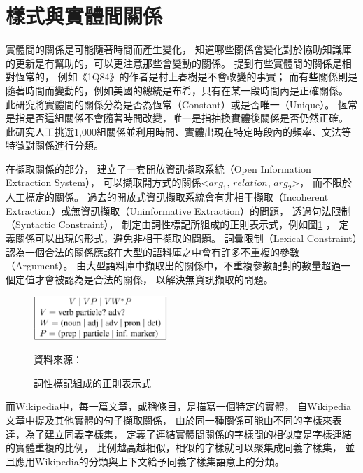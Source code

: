 
%
%
\section{樣式與實體間關係}

實體間的關係是可能隨著時間而產生變化，
知道哪些關係會變化對於協助知識庫的更新是有幫助的，可以更注意那些會變動的關係。
\cite{relationsByTime} 提到有些實體間的關係是相對恆常的，
例如《1Q84》的作者是村上春樹是不會改變的事實；
而有些關係則是隨著時間而變動的，例如美國的總統是布希，只有在某一段時間內是正確關係。
此研究將實體間的關係分為是否為恆常（Constant）或是否唯一（Unique）。
恆常是指是否這組關係不會隨著時間改變，唯一是指抽換實體後關係是否仍然正確。
此研究人工挑選1,000組關係並利用時間、實體出現在特定時段內的頻率、文法等特徵對關係進行分類。

在擷取關係的部分，
\cite{reverb} 建立了一套開放資訊擷取系統（Open Information Extraction System），
可以擷取開方式的關係<$arg_1$, $relation$, $arg_2$>，
而不限於人工標定的關係。
過去的開放式資訊擷取系統會有非相干擷取（Incoherent Extraction）或無資訊擷取（Uninformative Extraction）的問題，
透過句法限制（Syntactic Constraint），
制定由詞性標記所組成的正則表示式，例如圖\ref{i:reverb-pos} ，
定義關係可以出現的形式，避免非相干擷取的問題。
詞彙限制（Lexical Constraint）認為一個合法的關係應該在大型的語料庫之中會有許多不重複的參數（Argument）。
由大型語料庫中擷取出的關係中，不重複參數配對的數量超過一個定值才會被認為是合法的關係，
以解決無資訊擷取的問題。

\begin{figure}
    \centering
    \includegraphics[width=0.45\textwidth]{images/02-reverb-pos}
    \caption{詞性標記組成的正則表示式}
    資料來源：\cite{reverb}
    \label{i:reverb-pos}
\end{figure}

而Wikipedia中，每一篇文章，或稱條目，是描寫一個特定的實體，
\cite{wisenet} 自Wikipedia文章中提及其他實體的句子擷取關係，
由於同一種關係可能由不同的字樣來表達，為了建立同義字樣集，
定義了連結實體間關係的字樣間的相似度是字樣連結的實體重複的比例，
比例越高越相似，相似的字樣就可以聚集成同義字樣集，
並且應用Wikipedia的分類與上下文給予同義字樣集語意上的分類。

